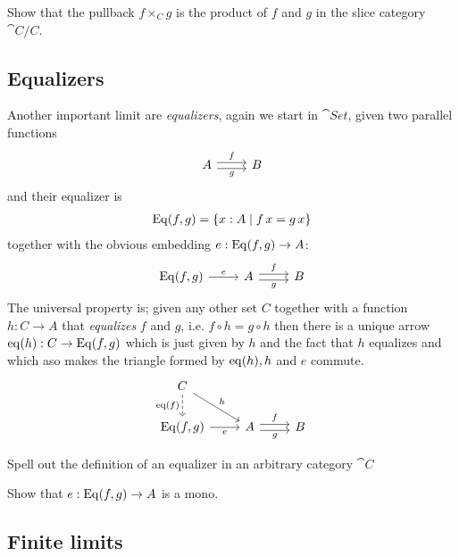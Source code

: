 \begin{Exercise}
  Show that the pullback $f \times_C g$ is the product of $f$ and $g$ in the slice category $\cat{C}/C$.
\end{Exercise}

\subsection*{Equalizers}
\label{sec:equalizers}

Another important limit are \emph{equalizers}, again we start in $\cat{Set}$, given two parallel functions
\[\begin{tikzcd}
  A \arrow[r,"f",shift left] \arrow[r,"g" below,shift right]& B 
\end{tikzcd}\]
and their equalizer is 
\begin{align*}
\mathrm{Eq}(f,g)  = \{ x : A \mid f\,x = g\,x \}
\end{align*}
together with the obvious embedding $e : \mathrm{Eq}(f,g) \to A$:
\[\begin{tikzcd}
  \Eq{f}{g} \arrow[r,"e"] & A \arrow[r,"f",shift left] \arrow[r,"g" below,shift right]& B 
\end{tikzcd}\]
The universal property is; given any other set $C$ together with a function $h : C \to A$ that \emph{equalizes} $f$ and $g$, i.e. $f \circ h = g \circ h$ then there is a unique arrow $\mathrm{eq}(h) : C \to \mathrm{Eq}(f,g)$ which is just given by $h$ and the fact that $h$ equalizes and which aso makes the triangle formed by $\mathrm{eq}(h),h$ and $e$ commute.
\[\begin{tikzcd}
    C \arrow[dr,"h"] \arrow[d, dashrightarrow,"\eq{f}" left] \\
  \Eq{f}{g} \arrow[r,"e" below] & A \arrow[r,"f",shift left] \arrow[r,"g" below,shift right]& B 
\end{tikzcd}\]

\begin{Exercise}
  Spell out the definition of an equalizer in an arbitrary category $\cat{C}$
\end{Exercise}

\begin{Exercise}
  Show that  $e : \mathrm{Eq}(f,g) \to A$ is a mono.
\end{Exercise}

\subsection*{Finite limits}
\label{sec:finite-limits}

